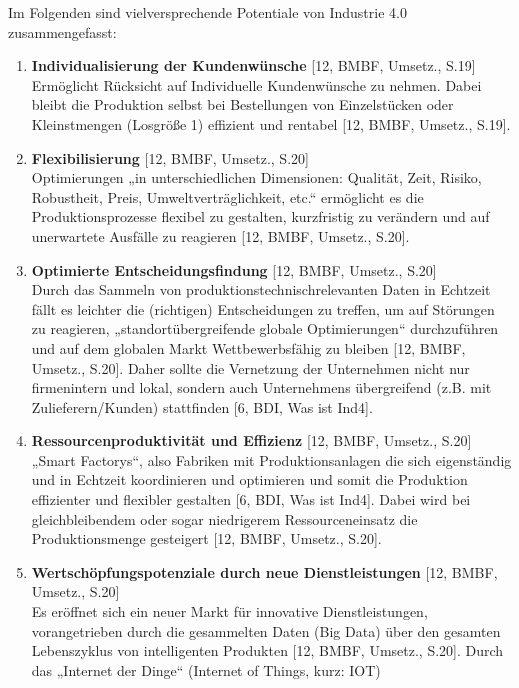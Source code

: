 \newline\newline
Im Folgenden sind vielversprechende Potentiale von Industrie 4.0 zusammengefasst:
\begin{enumerate}
	\item \textbf{Individualisierung der Kundenwünsche} [12, BMBF, Umsetz., S.19] \\
	Ermöglicht Rücksicht auf Individuelle Kundenwünsche zu nehmen. Dabei bleibt die 
	Produktion selbst bei Bestellungen von Einzelstücken oder Kleinstmengen (Losgröße 1) 
	effizient und rentabel [12, BMBF, Umsetz., S.19].
	\item \textbf{Flexibilisierung} [12, BMBF, Umsetz., S.20] \\
	Optimierungen „in unterschiedlichen Dimensionen: Qualität, Zeit, Risiko, Robustheit, Preis,
	Umweltverträglichkeit, etc.“ ermöglicht es die Produktionsprozesse flexibel zu gestalten,
	kurzfristig zu verändern und auf unerwartete Ausfälle zu reagieren [12, BMBF, Umsetz., S.20].
	\item \textbf{Optimierte Entscheidungsfindung} [12, BMBF, Umsetz., S.20] \\
	Durch das Sammeln von produktionstechnischrelevanten Daten in Echtzeit fällt es leichter
	die (richtigen) Entscheidungen zu treffen, um auf Störungen zu reagieren, 
	„standortübergreifende globale Optimierungen“ durchzuführen und auf dem globalen Markt 
	Wettbewerbsfähig zu bleiben [12, BMBF, Umsetz., S.20]. Daher sollte die Vernetzung der 
	Unternehmen nicht nur firmenintern und lokal, sondern auch Unternehmens übergreifend 
	(z.B. mit Zulieferern/Kunden) stattfinden [6, BDI, Was ist Ind4].
	\item \textbf{Ressourcenproduktivität und Effizienz} [12, BMBF, Umsetz., S.20] \\
	„Smart Factorys“, also Fabriken mit Produktionsanlagen die sich eigenständig und in Echtzeit 
	koordinieren und optimieren und somit die Produktion effizienter und flexibler gestalten [6, 
	BDI, Was ist Ind4]. Dabei wird bei gleichbleibendem oder sogar niedrigerem 
	Ressourceneinsatz die Produktionsmenge gesteigert [12, BMBF, Umsetz., S.20].
	\item \textbf{Wertschöpfungspotenziale durch neue Dienstleistungen} [12, BMBF, Umsetz., S.20] \\
	Es eröffnet sich ein neuer Markt für innovative Dienstleistungen, vorangetrieben durch die
	gesammelten Daten (Big Data) über den gesamten Lebenszyklus von intelligenten Produkten 
	[12, BMBF, Umsetz., S.20]. Durch das „Internet der Dinge“ (Internet of Things, kurz: IOT)

\end{enumerate}
